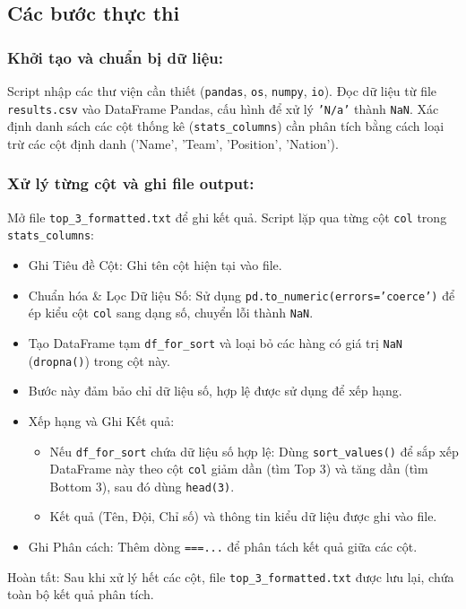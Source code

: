 \documentclass[12pt, a4paper]{report}
\begin{document}
\subsection{Các bước thực thi}
\subsubsection*{Khởi tạo và chuẩn bị dữ liệu:}
Script nhập các thư viện cần thiết (\texttt{pandas}, \texttt{os}, \texttt{numpy}, \texttt{io}).
Đọc dữ liệu từ file \texttt{results.csv} vào DataFrame Pandas, cấu hình để xử lý \texttt{'N/a'} thành \texttt{NaN}.
Xác định danh sách các cột thống kê (\texttt{stats\_columns}) cần phân tích bằng cách loại trừ các cột định danh ('Name', 'Team', 'Position', 'Nation').

\subsubsection*{Xử lý từng cột và ghi file output:}
Mở file \texttt{top\_3\_formatted.txt} để ghi kết quả.
Script lặp qua từng cột \texttt{col} trong \texttt{stats\_columns}:
\begin{itemize}
    \item Ghi Tiêu đề Cột: Ghi tên cột hiện tại vào file.
    \item Chuẩn hóa \& Lọc Dữ liệu Số: Sử dụng \texttt{pd.to\_numeric(errors='coerce')} để ép kiểu cột \texttt{col} sang dạng số, chuyển lỗi thành \texttt{NaN}.
    \item Tạo DataFrame tạm \texttt{df\_for\_sort} và loại bỏ các hàng có giá trị \texttt{NaN} (\texttt{dropna()}) trong cột này.
    \item Bước này đảm bảo chỉ dữ liệu số, hợp lệ được sử dụng để xếp hạng.
    \item Xếp hạng và Ghi Kết quả:
    \begin{itemize}
        \item Nếu \texttt{df\_for\_sort} chứa dữ liệu số hợp lệ: Dùng \texttt{sort\_values()} để sắp xếp DataFrame này theo cột \texttt{col} giảm dần (tìm Top 3) và tăng dần (tìm Bottom 3), sau đó dùng \texttt{head(3)}.
        \item Kết quả (Tên, Đội, Chỉ số) và thông tin kiểu dữ liệu được ghi vào file.
    \end{itemize}
    \item Ghi Phân cách: Thêm dòng \texttt{===...} để phân tách kết quả giữa các cột.
\end{itemize}
Hoàn tất: Sau khi xử lý hết các cột, file \texttt{top\_3\_formatted.txt} được lưu lại, chứa toàn bộ kết quả phân tích.
\end{document}
